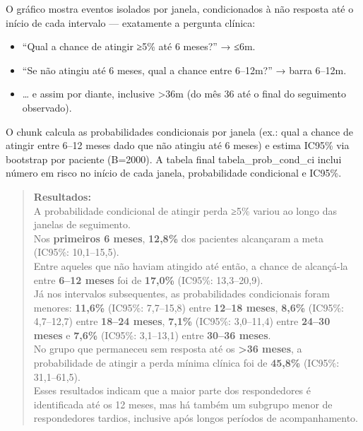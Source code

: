 \documentclass[
]{article}
\providecommand{\tightlist}{%
  \setlength{\itemsep}{0pt}\setlength{\parskip}{0pt}}\usepackage{longtable,booktabs,array}
\begin{document}
O gráfico mostra eventos isolados por janela, condicionados à não
resposta até o início de cada intervalo --- exatamente a pergunta
clínica:

\begin{itemize}
\tightlist
\item
  ``Qual a chance de atingir ≥5\% até 6 meses?'' → ≤6m.
\item
  ``Se não atingiu até 6 meses, qual a chance entre 6--12m?'' → barra
  6--12m.
\item
  \ldots{} e assim por diante, inclusive \textgreater36m (do mês 36 até
  o final do seguimento observado).
\end{itemize}

O chunk calcula as probabilidades condicionais por janela (ex.: qual a
chance de atingir entre 6--12 meses dado que não atingiu até 6 meses) e
estima IC95\% via bootstrap por paciente (B=2000). A tabela final
tabela\_prob\_cond\_ci inclui número em risco no início de cada janela,
probabilidade condicional e IC95\%.

\begin{quote}
\textbf{Resultados:}\\
A probabilidade condicional de atingir perda ≥5\% variou ao longo das
janelas de seguimento.\\
Nos \textbf{primeiros 6 meses}, \textbf{12,8\%} dos pacientes alcançaram
a meta (IC95\%: 10,1--15,5).\\
Entre aqueles que não haviam atingido até então, a chance de alcançá-la
entre \textbf{6--12 meses} foi de \textbf{17,0\%} (IC95\%:
13,3--20,9).\\
Já nos intervalos subsequentes, as probabilidades condicionais foram
menores: \textbf{11,6\%} (IC95\%: 7,7--15,8) entre \textbf{12--18
meses}, \textbf{8,6\%} (IC95\%: 4,7--12,7) entre \textbf{18--24 meses},
\textbf{7,1\%} (IC95\%: 3,0--11,4) entre \textbf{24--30 meses} e
\textbf{7,6\%} (IC95\%: 3,1--13,1) entre \textbf{30--36 meses}.\\
No grupo que permaneceu sem resposta até os \textbf{\textgreater36
meses}, a probabilidade de atingir a perda mínima clínica foi de
\textbf{45,8\%} (IC95\%: 31,1--61,5).\\
Esses resultados indicam que a maior parte dos respondedores é
identificada até os 12 meses, mas há também um subgrupo menor de
respondedores tardios, inclusive após longos períodos de acompanhamento.
\end{quote}
\end{document}

